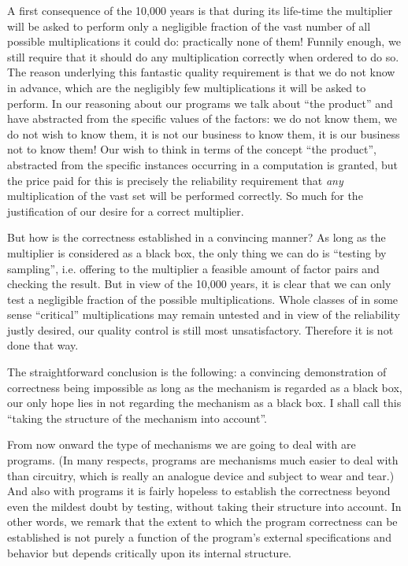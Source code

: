 A first consequence of the 10,000 years is that during its life-time the multiplier will be asked to perform only a negligible fraction of the vast number of all possible multiplications it could do: practically none of them! Funnily enough, we still require that it should do any multiplication correctly when ordered to do so. The reason underlying this fantastic quality requirement is that we do not know in advance, which are the negligibly few multiplications it will be asked to perform. In our reasoning about our programs we talk about ``the product'' and have abstracted from the specific values of the factors: we do not know them, we do not wish to know them, it is not our business to know them, it is our business not to know them! Our wish to think in terms of the concept ``the product'', abstracted from the specific instances occurring in a computation is granted, but the price paid for this is precisely the reliability requirement that \textit{any} multiplication of the vast set will be performed correctly. So much for the justification of our desire for a correct multiplier.

But how is the correctness established in a convincing manner? As long as the multiplier is considered as a black box, the only thing we can do is ``testing by sampling'', i.e. offering to the multiplier a feasible amount of factor pairs and checking the result. But in view of the 10,000 years, it is clear that we can only test a negligible fraction of the possible multiplications. Whole classes of in some sense ``critical'' multiplications may remain untested and in view of the reliability justly desired, our quality control is still most unsatisfactory. Therefore it is not done that way.

The straightforward conclusion is the following: a convincing demonstration of correctness being impossible as long as the mechanism is regarded
as a black box, our only hope lies in not regarding the mechanism as a black box. I shall call this ``taking the structure of the mechanism into account''.

From now onward the type of mechanisms we are going to deal with are programs. (In many respects, programs are mechanisms much easier to deal
with than circuitry, which is really an analogue device and subject to wear and tear.) And also with programs it is fairly hopeless to establish the correctness beyond even the mildest doubt by testing, without taking their structure into account. In other words, we remark that the extent to which the program correctness can be established is not purely a function of the program's external specifications and behavior but depends critically upon its internal structure.

